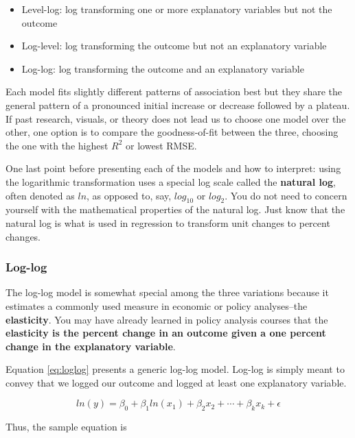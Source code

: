 \documentclass[
]{book}
\providecommand{\tightlist}{%
  \setlength{\itemsep}{0pt}\setlength{\parskip}{0pt}}
\begin{document}
\begin{itemize}
\tightlist
\item
  Level-log: log transforming one or more explanatory variables but not the outcome
\item
  Log-level: log transforming the outcome but not an explanatory variable
\item
  Log-log: log transforming the outcome and an explanatory variable
\end{itemize}

Each model fits slightly different patterns of association best but they share the general pattern of a pronounced initial increase or decrease followed by a plateau. If past research, visuals, or theory does not lead us to choose one model over the other, one option is to compare the goodness-of-fit between the three, choosing the one with the highest \(R^2\) or lowest RMSE.

One last point before presenting each of the models and how to interpret: using the logarithmic transformation uses a special log scale called the \textbf{natural log}, often denoted as \textbf{\(ln\)}, as opposed to, say, \(log_{10}\) or \(log_2\). You do not need to concern yourself with the mathematical properties of the natural log. Just know that the natural log is what is used in regression to transform unit changes to percent changes.

\hypertarget{log-log}{%
\subsubsection*{Log-log}\label{log-log}}

The log-log model is somewhat special among the three variations because it estimates a commonly used measure in economic or policy analyses--the \textbf{elasticity}. You may have already learned in policy analysis courses that the \textbf{elasticity is the percent change in an outcome given a one percent change in the explanatory variable}.

Equation \eqref{eq:loglog} presents a generic log-log model. Log-log is simply meant to convey that we logged our outcome and logged at least one explanatory variable.

\begin{equation}
ln(y)=\beta_0 + \beta_1ln(x_1) + \beta_2x_2 + \cdots + \beta_kx_k + \epsilon
\label{eq:loglog}
\end{equation}

Thus, the sample equation is
\end{document}
